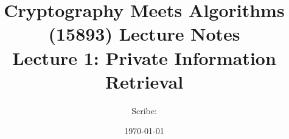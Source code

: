 \documentclass[11pt]{article}
\title{{\Large Cryptography Meets Algorithms (15893) Lecture Notes}\\[5pt]
{\bf Lecture 1: Private Information Retrieval}}
\author{Scribe: }
\date{\today}
\begin{document}
\maketitle


{

}
{

}
{

}
{

}
{

}
{

}






\end{document}

